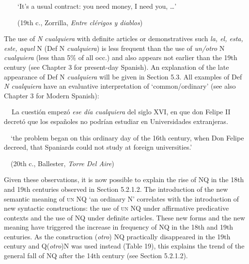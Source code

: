 \begin{styleStandard}
\ \ \ \ ‘It’s a usual contract: you need money, I need you, …’
\end{styleStandard}

\begin{styleStandard}
\ \ \ \ (19th c., Zorrilla, \textit{Entre clérigos y diablos})
\end{styleStandard}

\begin{styleStandard}
The use of\textit{ N cualquiera }with definite articles or demonstratives such \textit{la, el, esta, este, aquel} N (Def N \textit{cualquiera}) is less frequent than the use of \textit{un/otro} N \textit{cualquiera} (less than 5\% of all occ.) and also appears not earlier than the 19th century (see Chapter 3 for present-day Spanish). An explanation of the late appearance of Def N \textit{cualquiera} will be given in Section 5.3. All examples of Def \textit{N cualquiera }have an evaluative interpretation of ‘common/ordinary’ (see also Chapter 3 for Modern Spanish):
\end{styleStandard}

\begin{styleStandard}
\textbf{\ \ }La cuestión empezó \textit{ese día cualquiera} del siglo XVI, en que don Felipe II decretó que los españoles no podrían estudiar en Universidades extranjeras.
\end{styleStandard}

\begin{styleStandard}
\ \ ‘the problem began on this ordinary day of the 16th century, when Don Felipe decreed, that Spaniards could not study at foreign universities.’ 
\end{styleStandard}

\begin{styleStandard}
\ \ (20th c., Ballester, \textit{Torre Del Aire})
\end{styleStandard}

\begin{styleStandard}
Given these observations, it is now possible to explain the rise of NQ\textit{ }in the 18th and 19th centuries observed in Section 5.2.1.2. The introduction of the new semantic meaning of \textsc{un} NQ ‘an ordinary N’ correlates with the introduction of new syntactic constructions: the use of \textsc{un} NQ\textit{ }under affirmative predicative contexts and the use of NQ under definite articles. These new forms and the new meaning have triggered the increase in frequency of NQ\textit{ }in the 18th and 19th centuries. As the construction (\textit{otro}) NQ practically disappeared in the 19th century and Q(\textit{otro})N was used instead (Table 19), this explains the trend of the general fall of NQ after the 14th century (see Section 5.2.1.2).
\end{styleStandard}

